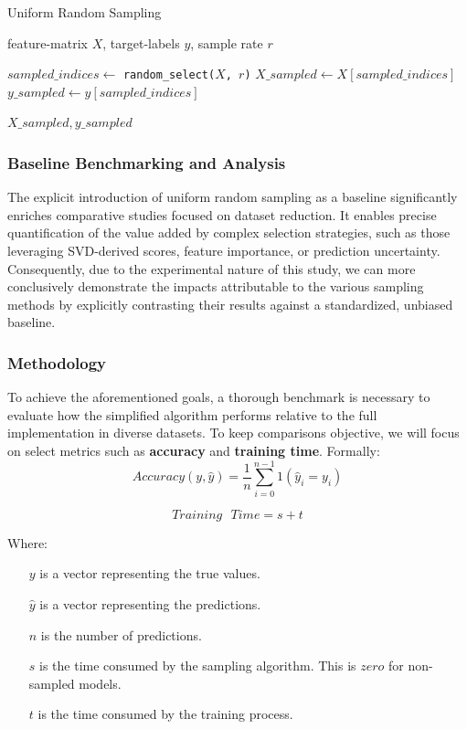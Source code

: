 \documentclass{article}
\theoremstyle{plain}
\theoremstyle{definition}
\theoremstyle{remark}
\begin{document}
\begin{algorithm}[tb]
	\caption{Uniform Random Sampling}
	\label{alg:random_alg}
	\begin{algorithmic}
		 feature-matrix $X$, target-labels $y$, sample rate $r$
		
		\vspace{0.25cm}
		
		\STATE $sampled\_indices \leftarrow$ \texttt{random\_select($X$, $r$)}
		\STATE $X\_sampled \leftarrow X[sampled\_indices]$
		\STATE $y\_sampled \leftarrow y[sampled\_indices]$
		
		\vspace{0.25cm}
		
		 \texttt{$X\_sampled, y\_sampled$}
	\end{algorithmic}
\end{algorithm}


\subsubsection{Baseline Benchmarking and Analysis}

The explicit introduction of uniform random sampling as a baseline significantly enriches comparative studies focused on dataset reduction. It enables precise quantification of the value added by complex selection strategies, such as those leveraging SVD-derived scores, feature importance, or prediction uncertainty. Consequently, due to the experimental nature of this study, we can more conclusively demonstrate the impacts attributable to the various sampling methods by explicitly contrasting their results against a standardized, unbiased baseline.


\subsubsection{Methodology}

To achieve the aforementioned goals, a thorough benchmark is necessary to evaluate how the simplified algorithm performs relative to the full implementation in diverse datasets. To keep comparisons objective, we will focus on select metrics such as \textbf{accuracy} and \textbf{training time}. Formally:
$$
Accuracy(y, \hat{y}) = \frac{1}{n} \sum_{i=0}^{n-1} 1(\hat{y}_i = y_i)
$$

$$
Training\text{ }Time = s + t
$$

Where:

\begin{itemize}

\item[$y$] is a vector representing the true values.
\item[$\hat{y}$] is a vector representing the predictions.
\item[$n$] is the number of predictions.
\item[$s$] is the time consumed by the sampling algorithm. This is $zero$ for non-sampled models.
\item[$t$] is the time consumed by the training process.


\end{itemize}
\end{document}
